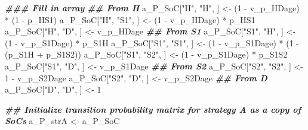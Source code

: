 \documentclass[
]{article}
\newenvironment{Shaded}{\begin{snugshade}}{\end{snugshade}}
\newcommand{\DecValTok}[1]{\textcolor[rgb]{0.00,0.00,0.81}{#1}}
\newcommand{\DocumentationTok}[1]{\textcolor[rgb]{0.56,0.35,0.01}{\textbf{\textit{#1}}}}
\newcommand{\NormalTok}[1]{#1}
\newcommand{\OtherTok}[1]{\textcolor[rgb]{0.56,0.35,0.01}{#1}}
\newcommand{\SpecialCharTok}[1]{\textcolor[rgb]{0.00,0.00,0.00}{#1}}
\newcommand{\StringTok}[1]{\textcolor[rgb]{0.31,0.60,0.02}{#1}}
\begin{document}
\begin{Shaded}
\begin{Highlighting}[]
\DocumentationTok{\#\#\# Fill in array}
\DocumentationTok{\#\# From H}
\NormalTok{a\_P\_SoC[}\StringTok{"H"}\NormalTok{, }\StringTok{"H"}\NormalTok{, ]   }\OtherTok{\textless{}{-}}\NormalTok{ (}\DecValTok{1} \SpecialCharTok{{-}}\NormalTok{ v\_p\_HDage) }\SpecialCharTok{*}\NormalTok{ (}\DecValTok{1} \SpecialCharTok{{-}}\NormalTok{ p\_HS1)}
\NormalTok{a\_P\_SoC[}\StringTok{"H"}\NormalTok{, }\StringTok{"S1"}\NormalTok{, ]  }\OtherTok{\textless{}{-}}\NormalTok{ (}\DecValTok{1} \SpecialCharTok{{-}}\NormalTok{ v\_p\_HDage) }\SpecialCharTok{*}\NormalTok{ p\_HS1}
\NormalTok{a\_P\_SoC[}\StringTok{"H"}\NormalTok{, }\StringTok{"D"}\NormalTok{, ]   }\OtherTok{\textless{}{-}}\NormalTok{ v\_p\_HDage}
\DocumentationTok{\#\# From S1}
\NormalTok{a\_P\_SoC[}\StringTok{"S1"}\NormalTok{, }\StringTok{"H"}\NormalTok{, ]  }\OtherTok{\textless{}{-}}\NormalTok{ (}\DecValTok{1} \SpecialCharTok{{-}}\NormalTok{ v\_p\_S1Dage) }\SpecialCharTok{*}\NormalTok{ p\_S1H}
\NormalTok{a\_P\_SoC[}\StringTok{"S1"}\NormalTok{, }\StringTok{"S1"}\NormalTok{, ] }\OtherTok{\textless{}{-}}\NormalTok{ (}\DecValTok{1} \SpecialCharTok{{-}}\NormalTok{ v\_p\_S1Dage) }\SpecialCharTok{*}\NormalTok{ (}\DecValTok{1} \SpecialCharTok{{-}}\NormalTok{ (p\_S1H }\SpecialCharTok{+}\NormalTok{ p\_S1S2))}
\NormalTok{a\_P\_SoC[}\StringTok{"S1"}\NormalTok{, }\StringTok{"S2"}\NormalTok{, ] }\OtherTok{\textless{}{-}}\NormalTok{ (}\DecValTok{1} \SpecialCharTok{{-}}\NormalTok{ v\_p\_S1Dage) }\SpecialCharTok{*}\NormalTok{ p\_S1S2}
\NormalTok{a\_P\_SoC[}\StringTok{"S1"}\NormalTok{, }\StringTok{"D"}\NormalTok{, ]  }\OtherTok{\textless{}{-}}\NormalTok{ v\_p\_S1Dage}
\DocumentationTok{\#\# From S2}
\NormalTok{a\_P\_SoC[}\StringTok{"S2"}\NormalTok{, }\StringTok{"S2"}\NormalTok{, ] }\OtherTok{\textless{}{-}} \DecValTok{1} \SpecialCharTok{{-}}\NormalTok{ v\_p\_S2Dage}
\NormalTok{a\_P\_SoC[}\StringTok{"S2"}\NormalTok{, }\StringTok{"D"}\NormalTok{, ]  }\OtherTok{\textless{}{-}}\NormalTok{ v\_p\_S2Dage}
\DocumentationTok{\#\# From D}
\NormalTok{a\_P\_SoC[}\StringTok{"D"}\NormalTok{, }\StringTok{"D"}\NormalTok{, ]   }\OtherTok{\textless{}{-}} \DecValTok{1}

\DocumentationTok{\#\# Initialize transition probability matrix for strategy A as a copy of SoC\textquotesingle{}s}
\NormalTok{a\_P\_strA }\OtherTok{\textless{}{-}}\NormalTok{ a\_P\_SoC}
\end{Highlighting}
\end{Shaded}
\end{document}

